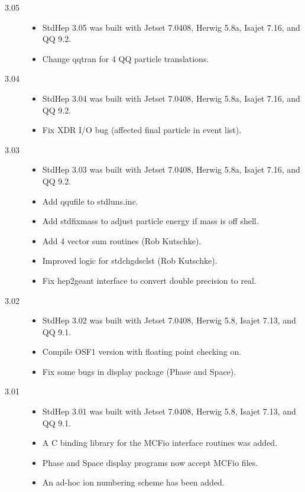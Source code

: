 \begin{description}
\item[3.05]

\begin{itemize}
\item StdHep 3.05 was built with Jetset 7.0408, Herwig 5.8a, Isajet 7.16, and QQ
 9.2.
\item Change qqtran for 4 QQ particle translations.
\end{itemize}

\item[3.04]

\begin{itemize}
\item StdHep 3.04 was built with Jetset 7.0408, Herwig 5.8a, Isajet 7.16, and QQ 9.2.
\item Fix XDR I/O bug (affected final particle in event list).
\end{itemize}

\item[3.03]

\begin{itemize}
\item StdHep 3.03 was built with Jetset 7.0408, Herwig 5.8a, Isajet 7.16, and QQ 9.2.
\item Add qqufile to stdluns.inc.
\item Add stdfixmass to adjust particle energy if mass is off shell.
\item Add 4 vector sum routines (Rob Kutschke).
\item Improved logic for stdchgdsclst (Rob Kutschke).
\item Fix hep2geant interface to convert double precision to real.
\end{itemize}

\item[3.02]

\begin{itemize}
\item StdHep 3.02 was built with Jetset 7.0408, Herwig 5.8, Isajet 7.13, and QQ 9.1.
\item Compile OSF1 version with floating point checking on.
\item Fix some bugs in display package (Phase and Space).
\end{itemize}

\item[3.01]

\begin{itemize}
\item StdHep 3.01 was built with Jetset 7.0408, Herwig 5.8, Isajet 7.13, and QQ
9.1.
\item A C binding library for the MCFio interface routines was added.
\item Phase and Space display programs now accept MCFio files.
\item An ad-hoc ion numbering scheme has been added.
\end{itemize}


\end{description}
